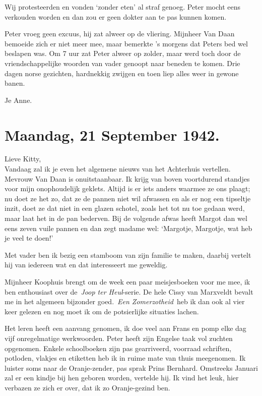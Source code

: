\documentclass{book}
\begin{document}
Wij protesteerden en vonden `zonder eten' al straf genoeg. Peter mocht eens
verkouden worden en dan zou er geen dokter aan te pas kunnen komen.

Peter vroeg geen excuus, hij zat alweer op de vliering. Mijnheer Van Daan
bemoeide zich er niet meer mee, maar bemerkte 's morgens dat Peters bed wel
beslapen was. Om 7 uur zat Peter alweer op zolder, maar werd toch door de
vriendschappelijke woorden van vader genoopt naar beneden te komen. Drie dagen
norse gezichten, hardnekkig zwijgen en toen liep alles weer in gewone banen.

Je Anne.

\section*{Maandag, 21 September 1942.}

Lieve Kitty,\\
Vandaag zal ik je even het algemene nieuws van het Achterhuis
vertellen. Mevrouw Van Daan is onuitstaanbaar. Ik krijg van boven voortdurend
standjes voor mijn onophoudelijk geklets. Altijd is er iets anders waarmee ze
ons plaagt; nu doet ze het zo, dat ze de pannen niet wil afwassen en als er nog
een tipseltje inzit, doet ze dat niet in een glazen schotel, zoals het tot nu
toe gedaan werd, maar laat het in de pan bederven. Bij de volgende afwas heeft
Margot dan wel eens zeven vuile pannen en dan zegt madame wel: `Margotje,
Margotje, wat heb je veel te doen!'

Met vader ben ik bezig een stamboom van zijn familie te maken, daarbij vertelt
hij van iedereen wat en dat interesseert me geweldig.

Mijnheer Koophuis brengt om de week een paar meisjesboeken voor me mee, ik ben
enthousiast over de~\emph{Joop ter Heul}-serie. De hele Cissy van Marxveldt
bevalt me in het algemeen bijzonder goed.~\emph{Een Zomerzotheid}~heb ik dan ook
al vier keer gelezen en nog moet ik om de potsierlijke situaties lachen.

Het leren heeft een aanvang genomen, ik doe veel aan Frans en pomp elke dag vijf
onregelmatige werkwoorden. Peter heeft zijn Engelse taak vol zuchten opgenomen.
Enkele schoolboeken zijn pas gearriveerd, voorraad schriften, potloden, vlakjes
en etiketten heb ik in ruime mate van thuis meegenomen. Ik luister soms naar de
Oranje-zender, pas sprak Prins Bernhard. Omstreeks Januari zal er een kindje bij
hen geboren worden, vertelde hij. Ik vind het leuk, hier verbazen ze zich er
over, dat ik zo Oranje-gezind ben.
\end{document}

